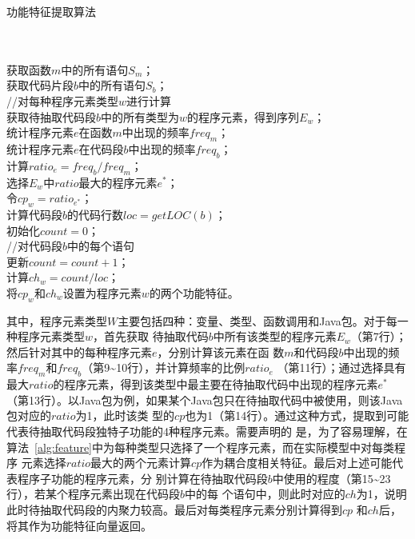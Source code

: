 \begin{algorithm}[H]
\caption{功能特征提取算法}\label{alg:feature}
\\
\\
获取函数$m$中的所有语句$S_m$；\\
获取代码片段$b$中的所有语句$S_b$；\\
 {
  //对每种程序元素类型$w$进行计算\\
  获取待抽取代码段$b$中的所有类型为$w$的程序元素，得到序列$E_w$；\\
   {
    统计程序元素$e$在函数$m$中出现的频率$freq_m$；\\
    统计程序元素$e$在代码段$b$中出现的频率$freq_b$；\\
    计算$ratio_e = freq_b/freq_m$；\\
  }
  选择$E_w$中$ratio$最大的程序元素$e^*$；\\
  令$cp_w = ratio_{e^*}$；\\
  计算代码段$b$的代码行数$loc = getLOC(b)$；\\
  初始化$count = 0$；\\
   {
    //对代码段$b$中的每个语句\\
     {
      更新$count = count + 1$；\\
    }
  }
  计算$ch_w = count/loc$；\\
  将$cp_w$和$ch_w$设置为程序元素$w$的两个功能特征。\\
}
\end{algorithm}

其中，程序元素类型$W$主要包括四种：变量、类型、函数调用和Java包。对于每一种程序元素类型$w$，首先获取
待抽取代码$b$中所有该类型的程序元素$E_w$（第7行）；然后针对其中的每种程序元素$e$，分别计算该元素在函
数$m$和代码段$b$中出现的频率$freq_m$和$freq_b$（第9\textasciitilde10行），并计算频率的比例$ratio_e$
（第11行）；通过选择具有最大$ratio$的程序元素，得到该类型中最主要在待抽取代码中出现的程序元素$e^*$
（第13行）。以Java包为例，如果某个Java包只在待抽取代码中被使用，则该Java包对应的$ratio$为1，此时该类
型的$cp$也为1（第14行）。通过这种方式，提取到可能代表待抽取代码段独特子功能的4种程序元素。需要声明的
是，为了容易理解，在算法~\ref{alg:feature}中为每种类型只选择了一个程序元素，而在实际模型中对每类程序
元素选择$ratio$最大的两个元素计算$cp$作为耦合度相关特征。最后对上述可能代表程序子功能的程序元素，分
别计算在待抽取代码段$b$中使用的程度（第15\textasciitilde23行），若某个程序元素出现在代码段$b$中的每
个语句中，则此时对应的$ch$为1，说明此时待抽取代码段的内聚力较高。最后对每类程序元素分别计算得到$cp$
和$ch$后，将其作为功能特征向量返回。

